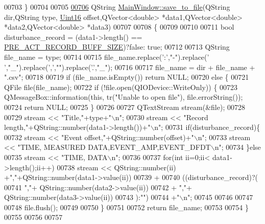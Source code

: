 \begin{DoxyCode}
00703 \}
00704 
00705 
\hypertarget{a00038_source_l00706}{}\hyperlink{a00006_a0114355b9f626345cf77d6f714f51468}{00706} QString \hyperlink{a00006_a0114355b9f626345cf77d6f714f51468}{MainWindow::save\_to\_file}(QString dir,QString type,
      \hyperlink{a00001_aae7407b021d43f7193a81a58cfb3e297}{Uint16} offset,QVector<double> *data1,QVector<double> *data2,QVector<double> *data3)
00707 
00708 \{
00709 
00710 
00711     \textcolor{keywordtype}{bool} disturbance\_record = (data1->length() == \hyperlink{a00003_a18dcecc16ded13fa622e0913e73442e6}{PRE\_ACT\_RECORD\_BUFF\_SIZE})?\textcolor{keyword}{false}:\textcolor{keyword}{
      true};
00712 
00713     QString file\_name = type;
00714 
00715     file\_name.replace(\textcolor{charliteral}{':'},\textcolor{stringliteral}{"-"}).replace(\textcolor{charliteral}{' '},\textcolor{stringliteral}{"\_"}).replace(\textcolor{charliteral}{','},\textcolor{stringliteral}{""}).replace(\textcolor{charliteral}{'.'},\textcolor{stringliteral}{"\_"});
00716 
00717     file\_name = dir + file\_name + \textcolor{stringliteral}{".csv"};
00718 
00719     \textcolor{keywordflow}{if} (file\_name.isEmpty()) \textcolor{keywordflow}{return} NULL;
00720     \textcolor{keywordflow}{else} \{
00721         QFile file(file\_name);
00722         \textcolor{keywordflow}{if} (!file.open(QIODevice::WriteOnly)) \{
00723             QMessageBox::information(\textcolor{keyword}{this}, tr(\textcolor{stringliteral}{"Unable to open file"}), file.errorString());
00724             \textcolor{keywordflow}{return} NULL;
00725         \}
00726 
00727         QTextStream stream(&file);
00728 
00729         stream << \textcolor{stringliteral}{"Title,"}+type+\textcolor{stringliteral}{"\(\backslash\)n"};
00730         stream << \textcolor{stringliteral}{"Record length,"}+QString::number(data1->length())+\textcolor{stringliteral}{"\(\backslash\)n"};
00731         \textcolor{keywordflow}{if}(disturbance\_record)\{
00732         stream << \textcolor{stringliteral}{"Event offset,"}+QString::number(offset)+\textcolor{stringliteral}{"\(\backslash\)n"};
00733         stream << \textcolor{stringliteral}{"TIME, MEASURED DATA,EVENT\_AMP,EVENT\_DFDT\(\backslash\)n"};
00734         \}\textcolor{keywordflow}{else}
00735         stream << \textcolor{stringliteral}{"TIME, DATA\(\backslash\)n"};
00736 
00737         \textcolor{keywordflow}{for}(\textcolor{keywordtype}{int} ii=0;ii< data1->length();ii++)
00738            stream << QString::number(ii) +\textcolor{stringliteral}{","}+QString::number(data1->value(ii))
00739                      +
00740                      ((disturbance\_record)?(
00741                      \textcolor{stringliteral}{","}+ QString::number(data2->value(ii))
00742                      + \textcolor{stringliteral}{","}+ QString::number(data3->value(ii))
00743                      ):\textcolor{stringliteral}{""})
00744                      +\textcolor{stringliteral}{"\(\backslash\)n"};
00745 
00746 
00747 
00748         file.flush();
00749 
00750      \}
00751 
00752     \textcolor{keywordflow}{return} file\_name;
00753 
00754 \}
00755 
00756 
00757 
\end{DoxyCode}
